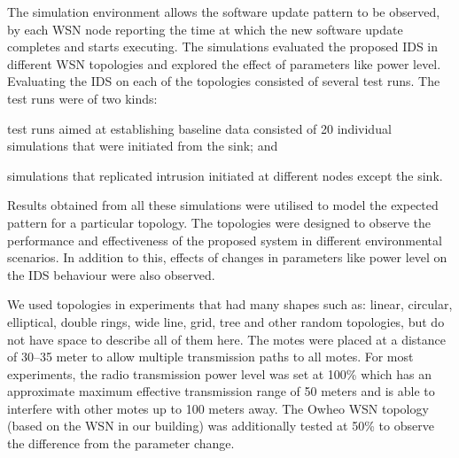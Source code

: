 \documentclass[conference]{IEEEtran}
\newcommand{\notedme}[1]{\raisebox{0pt}[0pt][0pt]{\pdfcomment[open=true,color=blue]{#1}}}
\begin{document}

The simulation environment allows the software update pattern to be observed, by each WSN node reporting the time at which the new software update completes and starts executing.
The simulations evaluated the proposed IDS in different WSN topologies and explored the effect of parameters like power level.
Evaluating the IDS on each of the topologies consisted of several test runs.
The test runs were of two kinds: 
\begin{inparaenum}
\item test runs aimed at establishing baseline data consisted of 20 individual simulations that were initiated from the sink; and
\item simulations that replicated intrusion initiated at different nodes except the sink.
\end{inparaenum}
Results obtained from all these simulations were utilised to model the expected pattern for a particular topology.
%
The topologies were designed to observe the performance and effectiveness %
of the proposed system in different environmental scenarios. 
In addition to this, effects of changes in parameters like power level on the IDS behaviour were also observed.


We used topologies in experiments that had many shapes such as: linear, circular, elliptical, double rings, wide line, grid, tree and other random topologies, but do not have space to describe all of them here.
The motes were placed at a distance of 30--35 meter to allow  multiple transmission paths to all motes. %
For most experiments, the radio transmission power level was set at 100\% which has an approximate maximum effective transmission range of 50 meters and is able to interfere with other motes up to 100 meters away.
The Owheo WSN topology (based on the WSN in our building) was additionally tested at 50\%  to %
observe the difference from the parameter change.
\end{document}

